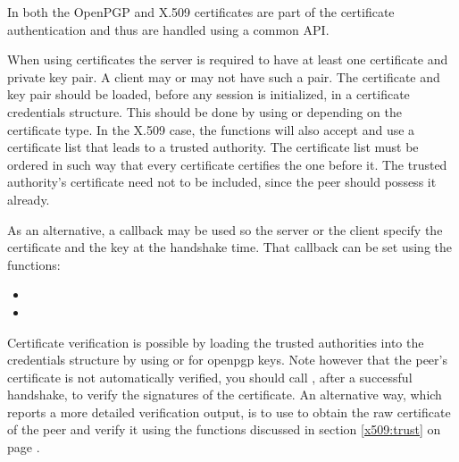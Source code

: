 In \gnutls{} both the OpenPGP and X.509 certificates are part of the
certificate authentication and thus are handled using a common API.
\par
When using certificates the server is required
to have at least one certificate and private key pair. A client
may or may not have such a pair. The certificate and key pair
should be loaded, before any \tls{} session is initialized,
in a certificate credentials structure. This should be done by using
or
depending on the certificate type. 
In the X.509 case, the functions will also accept and use a certificate list 
that leads to a trusted authority. The certificate list must be ordered in such
way that every certificate certifies the one before it. The trusted authority's
certificate need not to be included, since the peer should possess it already.
\par
As an alternative, a callback may be used
so the server or the client specify the certificate and the key at the handshake time.
That callback can be set using the functions:
\begin{itemize}
\item {}
\item {}
\end{itemize}
Certificate verification is possible by loading the trusted authorities
into the credentials structure by using
or
for openpgp keys. Note however that the peer's certificate is not automatically verified,
you should call ,
after a successful handshake,
to verify the signatures of the certificate. An alternative way, which reports
a more detailed verification output, is to use
 to obtain
the raw certificate of the peer and verify it using the functions discussed in
section \ref{x509:trust} on page \pageref{x509:trust}. 

